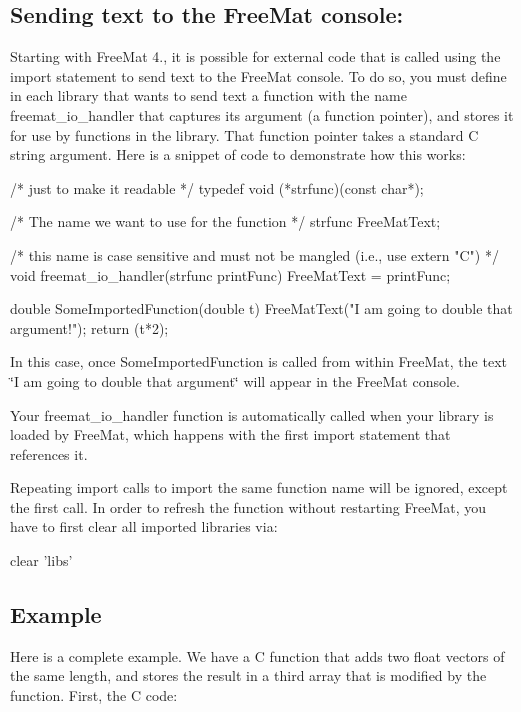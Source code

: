 \subsection*{Sending text to the Free\-Mat console\-:}

Starting with Free\-Mat 4., it is possible for external code that is called using the {\ttfamily import} statement to send text to the Free\-Mat console. To do so, you must define in each library that wants to send text a function with the name {\ttfamily freemat\-\_\-io\-\_\-handler} that captures its argument (a function pointer), and stores it for use by functions in the library. That function pointer takes a standard C string argument. Here is a snippet of code to demonstrate how this works\-: \begin{DoxyVerb}  /* just to make it readable */
  typedef void (*strfunc)(const char*); 

  /* The name we want to use for the function */
  strfunc FreeMatText;                  

  /* this name is case sensitive and must not be mangled (i.e., use extern "C") */
  void freemat_io_handler(strfunc printFunc) {
     FreeMatText = printFunc;
  }

  double SomeImportedFunction(double t) {
     FreeMatText("I am going to double that argument!\n");
     return (t*2);
  }
\end{DoxyVerb}
 In this case, once {\ttfamily Some\-Imported\-Function} is called from within Free\-Mat, the text {\ttfamily \char`\"{}\-I am going to double that argument\char`\"{}} will appear in the Free\-Mat console.

Your {\ttfamily freemat\-\_\-io\-\_\-handler} function is automatically called when your library is loaded by Free\-Mat, which happens with the first {\ttfamily import} statement that references it.

Repeating {\ttfamily import} calls to import the same function name will be ignored, except the first call. In order to refresh the function without restarting Free\-Mat, you have to first clear all imported libraries via\-: \begin{DoxyVerb}   clear 'libs'
\end{DoxyVerb}
\hypertarget{variables_struct_Example}{}\subsection{Example}\label{variables_struct_Example}
Here is a complete example. We have a {\ttfamily C} function that adds two float vectors of the same length, and stores the result in a third array that is modified by the function. First, the {\ttfamily C} code\-:

